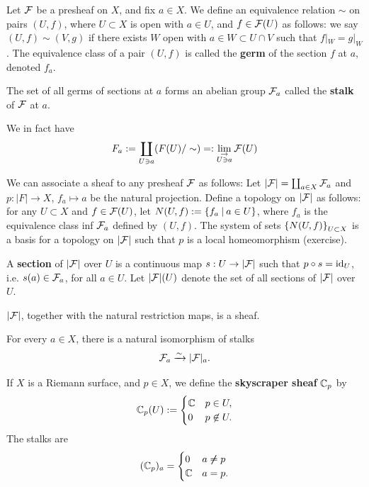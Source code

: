 \documentclass[11pt]{article}
\begin{document}
\begin{defn}
    Let $\mc F$ be a presheaf on $X$, and fix $a \in X$. We define an equivalence relation $\sim$ on pairs $(U,f)$, where $U\subset X$ is open with $a \in U$, and $f \in \mc F(U)$ as follows: we say $(U, f) \sim (V,g)$ if there exists $W$ open with $a \in W \subset U \cap V$ such that $f|_W = g|_W$. The equivalence class of a pair $(U,f)$ is called the \textbf{germ} of the section $f$ at $a$, denoted $f_a$. 
    
    The set of all germs of sections at $a$ forms an abelian group $\mc F_a$ called the \textbf{stalk} of $\mc F$ at $a$.
\end{defn}

\begin{notethm*}
    We in fact have
    \[
    F_a := \coprod _{U \ni a} (F(U)/\sim) =: \lim_{\substack{\to \\ U \ni a}} \mc F(U) 
    \]
\end{notethm*}
We can associate a sheaf to any presheaf $\mc F$ as follows: Let $|\mc F|=\coprod_{a \in X}\mc F_a$ and $p:|F| \to X$, $f_a \mapsto a$ be the natural projection. Define a topology on $|\mc F|$ as follows: for any $U \subset X$ and $f \in \mc F(U)$, let $N(U,f):=\brax{f_a \setbar a \in U}$, where $f_a$ is the equivalence class inf $\mc F_a$ defined by $(U, f)$. The system of sets $\brax{N(U,f)}_{U \subset X}$ is a basis for a topology on $|\mc F|$ such that $p$ is a local homeomorphism (exercise).

A \textbf{section} of $|\mc F|$ over $U$ is a continuous map $s:U \to |\mc F|$ such that $p \circ s=\id_U$, i.e. $s(a) \in \mc F_a$, for all $a \in U$. Let $|\mc F|(U)$ denote the set of all sections of $|\mc F|$ over $U$.

\begin{exercise}
    $|\mc F|$, together with the natural restriction maps, is a sheaf.
\end{exercise}

\begin{exercise}
    For every $a \in X$, there is a natural isomorphism of stalks
    \[
    \mc F_a \arr[\sim] |\mc F|_a.
    \]
\end{exercise}

\begin{ex}
    If $X$ is a Riemann surface, and $p \in X$, we define the \textbf{skyscraper sheaf} $\C_p$ by
    \[
    \C_p(U) := \case{\C & p \in U, \\ 0 & p \not \in U.}
    \]
    The stalks are
    \[
    (\C_p)_a = \case{0 & a \not \neq p \\ \C & a =p.}
    \]
\end{ex}
\end{document}
